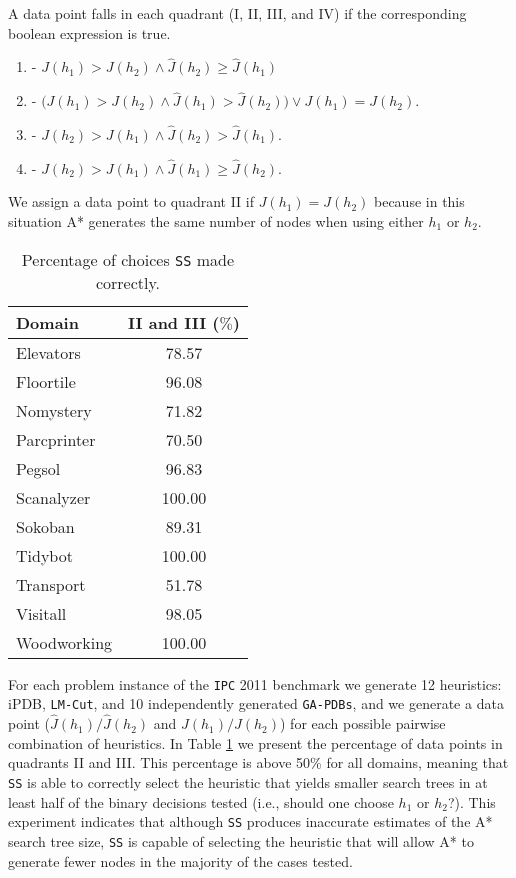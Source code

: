 
A data point falls in each quadrant (I, II, III, and IV) if the corresponding boolean expression is true. 

\begin{enumerate}[label=\Roman*] 
\item - $J(h_{1}) > J(h_{2}) \wedge \hat{J}(h_{2}) \ge \hat{J}(h_{1})$ 
\item - $\big(J(h_{1}) > J(h_{2}) \wedge \hat{J}(h_{1}) > \hat{J}(h_{2})\big) \vee J(h_{1}) = J(h_{2})$.
\item - $J(h_{2}) > J(h_{1}) \wedge \hat{J}(h_{2}) > \hat{J}(h_{1})$.
\item - $J(h_{2}) > J(h_{1}) \wedge \hat{J}(h_{1}) \ge \hat{J}(h_{2})$.
\end{enumerate}

We assign a data point to quadrant II if $J(h_{1}) = J(h_{2})$ because in this situation A* generates the same number of nodes when using either $h_1$ or $h_2$.

\begin{table}[htb]
\centering
\begin{tabular}{lc}
\hline
Domain      & II and III ($\%$) \\ \hline
Elevators   & 78.57    \\
Floortile   & 96.08    \\
Nomystery   & 71.82    \\
Parcprinter & 70.50    \\
Pegsol      & 96.83    \\
Scanalyzer  & 100.00   \\
Sokoban     & 89.31    \\
Tidybot     & 100.00   \\
Transport   & 51.78    \\
Visitall    & 98.05    \\
Woodworking & 100.00   \\ \hline
\end{tabular}
\caption{Percentage of choices \texttt{SS} made correctly.}
\label{tb:per_ss_made_correctly}
\end{table}

For each problem instance of the \texttt{IPC} 2011 benchmark we generate 12 heuristics: iPDB, \texttt{LM-Cut}, and 10 independently generated \texttt{GA-PDBs}, and we generate a data point ($\hat{J}(h_{1})/\hat{J}(h_{2})$ and $J(h_{1})/J(h_{2})$) for each possible pairwise combination of heuristics. In Table \ref{tb:per_ss_made_correctly} we present the percentage of data points in quadrants II and III. This percentage is above 50$\%$ for all domains, meaning that \texttt{SS} is able to correctly select the heuristic that yields smaller search trees in at least half of the binary decisions tested (i.e., should one choose $h_1$ or $h_2$?). 
%
This experiment indicates that although \texttt{SS} produces inaccurate estimates of the A* search tree size, \texttt{SS} is capable of selecting the heuristic that will allow A* to generate fewer nodes in the majority of the cases tested. 

